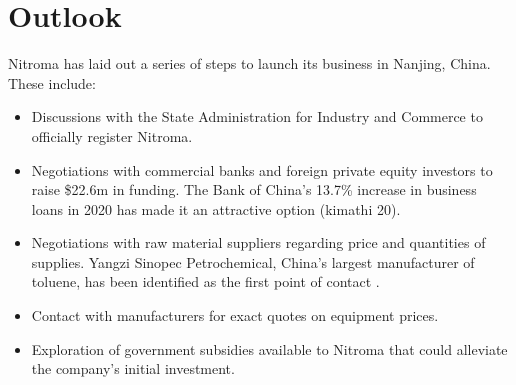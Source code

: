 \section{Outlook}
Nitroma has laid out a series of steps to launch its business in Nanjing, China. These include:
\begin{itemize}
    \item Discussions with the State Administration for Industry and Commerce to officially register Nitroma.
    \item Negotiations with commercial banks and foreign private equity investors to raise \$22.6m in funding. The Bank of China’s 13.7\% increase in business loans in 2020 has made it an attractive option (kimathi 20).
    \item Negotiations with raw material suppliers regarding price and quantities of supplies. Yangzi Sinopec Petrochemical, China’s largest manufacturer of toluene, has been identified as the first point of contact \cite{sinopec_group_sinopec_2014}.
    \item Contact with manufacturers for exact quotes on equipment prices.
    \item Exploration of government subsidies available to Nitroma that could alleviate the company’s initial investment. 
\end{itemize}



